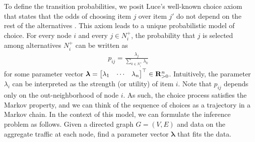 To define the transition probabilities, we posit Luce's well-known choice axiom that states that the odds of choosing item $j$ over item $j'$ do not depend on the rest of the alternatives \citep{luce1959individual}.
This axiom leads to a unique probabilistic model of choice.
For every node $i$ and every $j \in N^+_i$, the probability that $j$ is selected among alternatives $N^+_i$ can be written as
\begin{align}
\label{cr:eq:singlelik}
p_{ij} = \frac{\lambda_j}{\sum_{k \in N^+_i} \lambda_k}
\end{align}
for some parameter vector $\bm{\lambda} = \begin{bmatrix}\lambda_1 & \cdots & \lambda_n \end{bmatrix}^\top \in \mathbf{R}_{>0}^n$.
Intuitively, the parameter $\lambda_i$ can be interpreted as the strength (or utility) of item $i$.
Note that $p_{ij}$ depends only on the out-neighborhood of node $i$.
As such, the choice process satisfies the Markov property, and we can think of the sequence of choices as a trajectory in a Markov chain.
In the context of this model, we can formulate the inference problem as follows.
Given a directed graph $G = (V, E)$ and data on the aggregate traffic at each node, find a parameter vector $\bm{\lambda}$ that fits the data.
